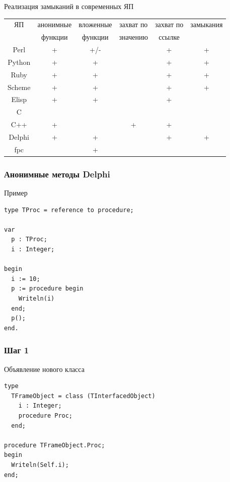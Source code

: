 \documentclass[roman,12pt]{beamer}
\newenvironment{changemargin}[2]{%
  \begin{list}{}{%
    \setlength{\topsep}{0pt}%
    \setlength{\leftmargin}{#1}%
    \setlength{\rightmargin}{#2}%
    \setlength{\listparindent}{\parindent}%
    \setlength{\itemindent}{\parindent}%
    \setlength{\parsep}{\parskip}%
  }%
  \item[]}{\end{list}}
\newcommand\Fontvi{\fontsize{11}{14}\selectfont}
\begin{document}
\begin{frame}{Реализация замыканий в современных ЯП}
\Fontvi
\begin{changemargin}{-1cm}{0cm} 

\begin{table}
\begin{tabular}{|c |c |c |c |c |c |}
\hline
ЯП & анонимные & вложенные & захват по & захват по & замыкания  \\
   & функции   & функции   & значению  & ссылке    &            \\
\hline
Perl       & + & +/- &   & + & + \\
Python     & + & + &   & + & + \\
Ruby       & + & + &   & + & + \\
\hline
Scheme      & + & + &   & + & + \\
Elisp      & + & + &   & + &   \\
\hline
C          &   &   &   &   &   \\
C++        & + &   & + & + &   \\
Delphi     & + & + &   & + & + \\
fpc        &   & + &   &   &   \\
\hline
\end{tabular}
\end{table}

\end{changemargin}

\end{frame}

\begin{frame}[fragile]
  \frametitle{Анонимные методы Delphi}
 \begin{block}{Пример}
   \begin{lstlisting}
type TProc = reference to procedure;

var
  p : TProc;
  i : Integer;

begin
  i := 10;
  p := procedure begin
    Writeln(i)
  end;
  p();
end.
   \end{lstlisting}
 \end{block} 
\end{frame}

\begin{frame}[fragile]
  \frametitle{Шаг 1}
 \begin{block}{Объявление нового класса}
   \begin{lstlisting}
type
  TFrameObject = class (TInterfacedObject)
    i : Integer;
    procedure Proc;
  end;

procedure TFrameObject.Proc;
begin
  Writeln(Self.i);
end;
   \end{lstlisting}
 \end{block} 
\end{frame}
\end{document}
